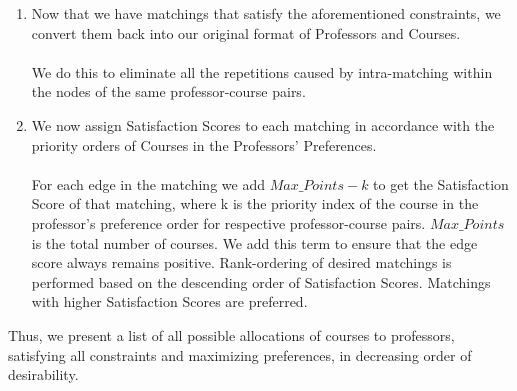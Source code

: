 \begin{enumerate}
\item Now that we have matchings that satisfy the aforementioned constraints, we convert them back into our original format of Professors and Courses.
\paragraph{} We do this to eliminate all the repetitions caused by intra-matching within the nodes of the same professor-course pairs.
\item  We now assign Satisfaction Scores to each matching in accordance with the priority orders of Courses in the Professors' Preferences.
\paragraph{} For each edge in the matching we add  \(Max\_Points - k\)  to get the Satisfaction Score of that matching, where k is the priority index of the course in the professor's preference order for respective professor-course pairs.  \(Max\_Points\)  is the total number of courses. We add this term to ensure that the edge score always remains positive. Rank-ordering of desired matchings is performed based on the descending order of Satisfaction Scores. Matchings with higher Satisfaction Scores are preferred.
\end{enumerate}
Thus, we present a list of all possible allocations of courses to professors, satisfying all constraints and maximizing preferences, in decreasing order of desirability.
\newpage

